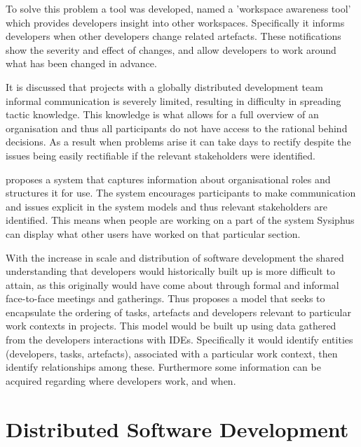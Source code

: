 \documentclass{l4proj}
\begin{document}
To solve this problem a tool was developed, named a 'workspace awareness tool' which provides developers insight into other workspaces.  Specifically it informs developers when other developers change related artefacts.  These notifications show the severity and effect of changes, and allow developers to work around what has been changed in advance.

It is discussed that projects with a globally distributed development team informal communication is severely limited, resulting in difficulty in spreading tactic knowledge.  This knowledge is what allows for a full overview of an organisation and thus all participants do not have access to the rational behind decisions.  As a result when problems arise it can take days to rectify despite the issues being easily rectifiable if the relevant stakeholders were identified.

\citet{bruegge06sysiphus} proposes a system that captures information about organisational roles and structures it for use.  The system encourages participants to make communication and issues explicit in the system models and thus relevant stakeholders are identified.  This means when people are working on a part of the system Sysiphus can display what other users have worked on that particular section.

With the increase in scale and distribution of software development the shared understanding that developers would historically built up is more difficult to attain, as this originally would have come about through formal and informal face-to-face meetings and gatherings.  Thus \citet{omoronyia09developer} proposes a model that seeks to encapsulate the ordering of tasks, artefacts and developers relevant to particular work contexts in projects.  This model would be built up using data gathered from the developers interactions with IDEs.  Specifically it would identify entities (developers, tasks, artefacts), associated with a particular work context, then identify relationships among these. Furthermore some information can be acquired regarding where developers work, and when.


\section {Distributed Software Development}
\end{document}
